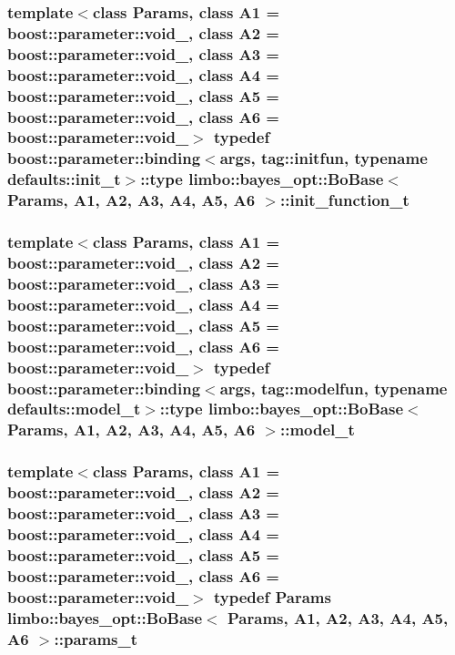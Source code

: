 \subsubsection[{init\+\_\+function\+\_\+t}]{\setlength{\rightskip}{0pt plus 5cm}template$<$class Params, class A1 = boost\+::parameter\+::void\+\_\+, class A2 = boost\+::parameter\+::void\+\_\+, class A3 = boost\+::parameter\+::void\+\_\+, class A4 = boost\+::parameter\+::void\+\_\+, class A5 = boost\+::parameter\+::void\+\_\+, class A6 = boost\+::parameter\+::void\+\_\+$>$ typedef boost\+::parameter\+::binding$<${\bf args}, tag\+::initfun, typename {\bf defaults\+::init\+\_\+t}$>$\+::type {\bf limbo\+::bayes\+\_\+opt\+::\+Bo\+Base}$<$ Params, A1, A2, A3, A4, A5, A6 $>$\+::{\bf init\+\_\+function\+\_\+t}}\label{classlimbo_1_1bayes__opt_1_1_bo_base_a734d263ce8c37ae2c5233f9e4499828c}
\hypertarget{classlimbo_1_1bayes__opt_1_1_bo_base_a151af5c7eef92a82d8813bb2e067d267}{}
\subsubsection[{model\+\_\+t}]{\setlength{\rightskip}{0pt plus 5cm}template$<$class Params, class A1 = boost\+::parameter\+::void\+\_\+, class A2 = boost\+::parameter\+::void\+\_\+, class A3 = boost\+::parameter\+::void\+\_\+, class A4 = boost\+::parameter\+::void\+\_\+, class A5 = boost\+::parameter\+::void\+\_\+, class A6 = boost\+::parameter\+::void\+\_\+$>$ typedef boost\+::parameter\+::binding$<${\bf args}, tag\+::modelfun, typename {\bf defaults\+::model\+\_\+t}$>$\+::type {\bf limbo\+::bayes\+\_\+opt\+::\+Bo\+Base}$<$ Params, A1, A2, A3, A4, A5, A6 $>$\+::{\bf model\+\_\+t}}\label{classlimbo_1_1bayes__opt_1_1_bo_base_a151af5c7eef92a82d8813bb2e067d267}
\hypertarget{classlimbo_1_1bayes__opt_1_1_bo_base_ae46fa6c574ca2a2c4368c8c9d3ff63e5}{}
\subsubsection[{params\+\_\+t}]{\setlength{\rightskip}{0pt plus 5cm}template$<$class Params, class A1 = boost\+::parameter\+::void\+\_\+, class A2 = boost\+::parameter\+::void\+\_\+, class A3 = boost\+::parameter\+::void\+\_\+, class A4 = boost\+::parameter\+::void\+\_\+, class A5 = boost\+::parameter\+::void\+\_\+, class A6 = boost\+::parameter\+::void\+\_\+$>$ typedef Params {\bf limbo\+::bayes\+\_\+opt\+::\+Bo\+Base}$<$ Params, A1, A2, A3, A4, A5, A6 $>$\+::{\bf params\+\_\+t}}\label{classlimbo_1_1bayes__opt_1_1_bo_base_ae46fa6c574ca2a2c4368c8c9d3ff63e5}
\hypertarget{classlimbo_1_1bayes__opt_1_1_bo_base_adda0d6bf0fa0def996eb0af7e8a84f3f}{}
